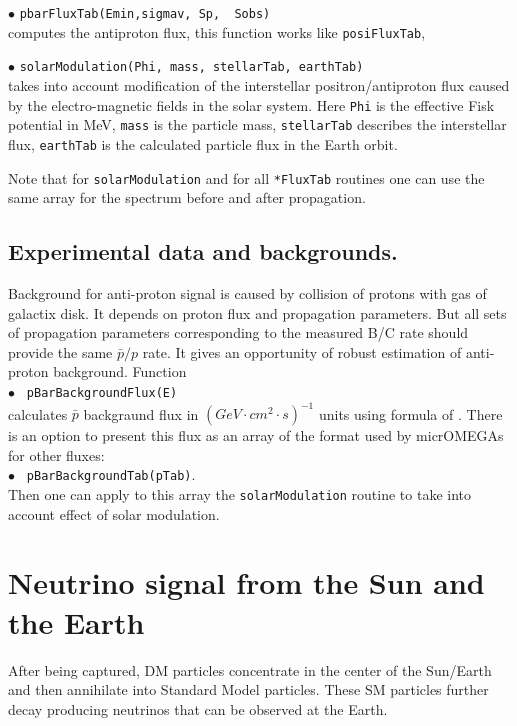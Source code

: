 \documentclass[12pt,a4paper]{article}
\begin{document}
\noindent
$\bullet$ \verb|pbarFluxTab(Emin,sigmav, Sp,  Sobs)|\\
computes the antiproton flux, this function works like \verb|posiFluxTab|,

\noindent
$\bullet$ \verb|solarModulation(Phi, mass, stellarTab, earthTab)|\\
takes into account modification of the interstellar positron/antiproton flux 
caused by the electro-magnetic fields in the solar system. Here \verb|Phi| is the
effective Fisk potential in MeV, \verb|mass| is the particle mass,
\verb|stellarTab| describes the interstellar flux, \verb|earthTab| 
is the calculated particle flux in the Earth orbit.

Note that for \verb|solarModulation| and for  all \verb|*FluxTab| 
routines one can use  the same array for the spectrum before and after propagation. 

\subsection{ Experimental data and backgrounds.}
Background  for  anti-proton  signal  is caused by  collision of protons with gas of
galactix disk. It depends on proton flux and propagation parameters. 
But all sets of  propagation parameters corresponding  to the measured  
B/C rate should provide the same $\bar{p}/p$ rate. It gives an opportunity of
robust estimation of anti-proton background. Function\\
$\bullet$ \verb| pBarBackgroundFlux(E)|\\
calculates $\bar{p}$ backgraund flux in $(GeV\cdot cm^2 \cdot s)^{-1}$ units
using formula of \cite{Maurin:2006hy}. There is an option to present this flux as 
an array of the format used by  micrOMEGAs for other fluxes: \\
 $\bullet$ \verb| pBarBackgroundTab(pTab)|.\\
Then one can apply to this array the {\tt solarModulation} routine to take into 
account effect of solar modulation.


\section{ Neutrino signal from the Sun and the Earth}
\label{sec:neutrino}

After being captured, DM particles concentrate in the center of the Sun/Earth and 
then  annihilate into Standard Model particles. These SM particles further decay producing neutrinos that can be 
observed at the Earth.   
\end{document}
